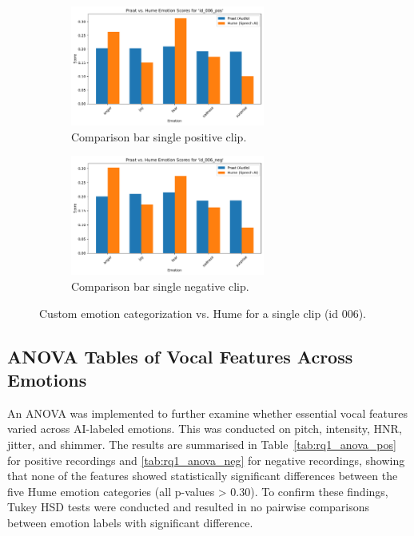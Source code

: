 \begin{figure}[H]
    \centering
    \begin{subfigure}[b]{0.45\textwidth}
        \centering
        \includegraphics[width=0.7\textwidth]{png/results/rq1_new/id_006_pos_praat_hume_comparison.pdf}
        \caption{Comparison bar single positive clip.}
        \label{fig:praat_hume_006_pos}
    \end{subfigure} 
    \begin{subfigure}[b]{0.45\textwidth}
        \centering
        \includegraphics[width=0.7\textwidth]{png/results/rq1_new/id_006_neg_praat_hume_comparison.pdf}
        \caption{Comparison bar single negative clip.}
        \label{fig:praat_hume_006_neg}
    \end{subfigure} 
    \caption{Custom emotion categorization vs. Hume for a single clip (id 006).}
    \label{fig:praat_hume_006_comb}
\end{figure}

\subsection{ANOVA Tables of Vocal Features Across Emotions}
An ANOVA was implemented to further examine whether essential vocal features varied across AI-labeled emotions. This was conducted on pitch, intensity, HNR, jitter, and shimmer. 
The results are summarised in Table~\ref{tab:rq1_anova_pos} for positive recordings and \ref{tab:rq1_anova_neg} for negative recordings, 
showing that none of the features showed statistically significant differences between the five Hume emotion categories (all p-values > 0.30). To confirm these findings, Tukey HSD tests were conducted and resulted in no pairwise comparisons between emotion labels with significant difference. 

